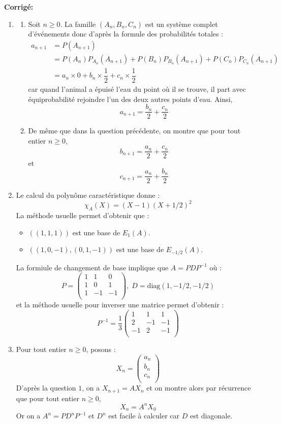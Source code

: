\documentclass[a4paper,twoside,french,10pt]{VcCours}
\newcommand{\corr}{\textbf{Corrigé:}}
\begin{document}
\corr \begin{enumerate}

	\item 
	\begin{enumerate}
		\item Soit $n \geq 0$. La famille $(A_n,B_n,C_n)$ est un système complet d'événements donc d'après la formule des probabilités totales :
\begin{align*}
a_{n+1} & = P(A_{n+1}) \\
& = P(A_n) P_{A_n}(A_{n+1}) +P(B_n) P_{B_n}(A_{n+1}) +P(C_n) P_{C_n}(A_{n+1}) \\
& = a_n \times 0 + b_n \times \dfrac{1}{2} + c_n \times \dfrac{1}{2} 
\end{align*}
car quand l'animal a \'epuis\'e l'eau du point o\`u il se trouve, il part avec \'equiprobabilit\'e rejoindre l'un des deux autres points d'eau. Ainsi,
$$ a_{n+1} =  \dfrac{b_n}{2} + \dfrac{c_n}{2}$$
		\item De même que dans la question précédente, on montre que pour tout entier $n \geq 0$,
$$ b_{n+1} =  \dfrac{a_n}{2} + \dfrac{c_n}{2}$$
et 
$$ c_{n+1} =  \dfrac{a_n}{2} + \dfrac{b_n}{2}$$
	\end{enumerate}
	
	\item Le calcul du polynôme caractéristique donne :
	$$ \chi_A(X) = (X-1)(X+1/2)^2$$
La méthode usuelle permet d'obtenir que :
\begin{itemize}
\item $((1,1,1))$ est une base de $E_1(A)$.
\item $((1,0,-1),(0,1,-1))$ est une base de $E_{-1/2}(A)$.
\end{itemize}
La formiule de changement de base implique que $A=PDP^{-1}$ où :
$$ P = \begin{pmatrix}
1 & 1 & 0 \\
1 & 0 & 1 \\
1 & -1 & -1 \\
\end{pmatrix}, \; D= \textrm{diag}(1,-1/2,-1/2)$$
et la méthode usuelle pour inverser une matrice permet d'obtenir :
$$ P^{-1} = \dfrac{1}{3} \begin{pmatrix}
1 & 1 & 1 \\
2 & -1 & -1 \\
-1 & 2 & -1 \\
\end{pmatrix}$$
\item Pour tout entier $n \geq 0$, posons : 
$$ X_n = \begin{pmatrix}
a_n \\
b_n \\
c_n \\
\end{pmatrix}$$
D'après la question $1$, on a $X_{n+1}=A X_n$ et on montre alors par récurrence que pour tout entier $n \geq 0$,
$$ X_n = A^n X_0$$
Or on a $A^n=PD^n P^{-1}$ et $D^n$ est facile à calculer car $D$ est diagonale.
\end{enumerate}
\end{document}
